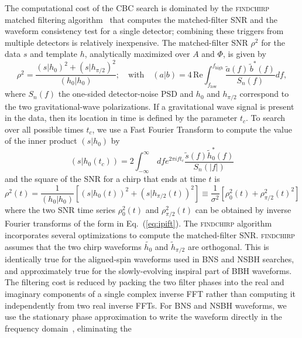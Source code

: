 The computational cost of the CBC search is dominated by the
\textsc{findchirp} matched filtering algorithm~\cite{Allen:2005fk} that
computes the matched-filter SNR and the waveform consistency test for a single
detector; combining these triggers from multiple detectors is relatively
inexpensive.
The matched-filter \ac{SNR} $\rho^2$ for the data $s$ and template $h$, analytically
maximized over $A$ and $\Phi$, is given by
%
\begin{equation}
\label{eq:cbc_snr}
\rho^2 = \frac{ (s|h_0)^2 + (s | h_{\pi/2})^2 }{(h_0|h_0)}; \quad
\textrm{with} \quad
(a|b) = 4 \, \mathrm{Re} \int_{f_{\mathrm{low}}}^{f_{\mathrm{high}}}
\frac{\tilde{a}(f) \, \tilde{b}^{*}(f)}{S_n(f)} df,
\end{equation}
%
where $S_n(f)$ the one-sided detector-noise \ac{PSD} and $h_0$ and $h_{\pi/2}$
correspond to the two gravitational-wave polarizations. 
If a gravitational wave signal is present in the data, then its location in time is
defined by the parameter $t_c$. To search over all possible
times $t_c$, we use a Fast Fourier Transform to compute the value of the inner product $(s|h_0)$ by
\begin{equation}
(s|h_0(t_c)) = 2 \int_{-\infty}^\infty\,df e^{2\pi ift_c}
\frac{\tilde{s}(f)\tilde{h}_0^\ast(f)}{S_n(|f|)}
\label{eq:ipift}
\end{equation}
and the square of the \ac{SNR} for a chirp that ends at time $t$ is
\begin{equation}
\rho^2(t) =  \frac{1}{(h_0|h_0)} \left[(s|h_0(t))^2 + (s|h_{\pi/2}(t))^2\right] \equiv \frac{1}{\sigma^2}\left[ \rho_0^2(t) + \rho^2_{\pi/2}(t)^2  \right]
\end{equation}
where the two \ac{SNR} time series $\rho^2_0(t)$ and $\rho^2_{\pi/2}(t)$ can be obtained by
inverse Fourier transforms of the form in Eq.~(\ref{eq:ipift}).
 The \textsc{findchirp} algorithm incorporates
several optimizations to compute the matched-filter SNR.
\textsc{findchirp}  assumes that the two chirp
waveforms $\tilde{h_0}$ and $\tilde{h}_{\pi/2}$ are orthogonal. This is
identically true for the aligned-spin waveforms used in \ac{BNS} and \ac{NSBH} searches,
and approximately true for the slowly-evolving inspiral part of \ac{BBH} waveforms.
The filtering cost is reduced by 
packing the two filter phases into
the real and imaginary components of a single complex inverse FFT rather than
computing it independently from two real inverse
FFTs. For BNS
and NSBH waveforms, we use the stationary phase approximation to write the
waveform directly in the frequency domain~\cite{Droz:1999qx}, eliminating the
